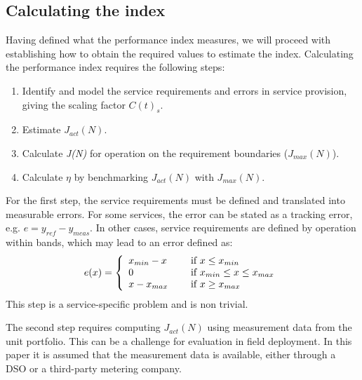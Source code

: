 	\subsection{Calculating the index}\label{sub:modelcalc}
	Having defined what the performance index measures, we will proceed with establishing how to obtain the required values to estimate the index. Calculating the performance index requires the following steps:
		\begin{enumerate}
		\item Identify and model the service requirements and errors in service provision, giving the scaling factor $C(t)_s$.
			\item Estimate $J_{act}(N)$.
			\item Calculate \emph{J(N)} for operation on the requirement boundaries ($J_{max}(N)$).
			\item Calculate $\eta$ by benchmarking $J_{act}(N)$ with $J_{max}(N)$.
		\end{enumerate}	
		
	For the first step, the service requirements must be defined and translated into measurable errors. For some services, the error can be stated as a tracking error, e.g. $e=y_{ref}-y_{meas}$. In other cases, service requirements are defined by operation within bands, which may lead to an error defined as:
	\begin{equation}
	e(x)= \left\{ \begin{array}{l l}
	x_{min} - x & \quad \text{ if } x \leq x_{min}\\
	0 & \quad \text{ if } x_{min} \leq x \leq x_{max}\\
	x - x_{max} & \quad \text{ if } x \geq x_{max}
	\end{array} \right.
	\end{equation}
	This step is a service-specific problem and is non trivial.

	The second step requires computing $J_{act}(N)$ using measurement data from the unit portfolio. This can be a challenge for evaluation in field deployment. In this paper it is assumed that the measurement data is available, either through a DSO or a third-party metering company.	
	
